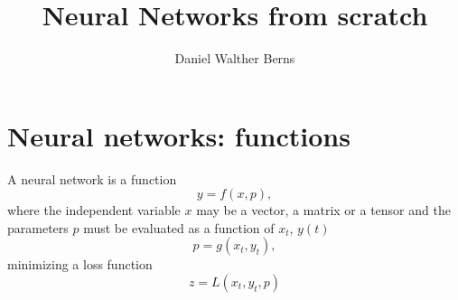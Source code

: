 \documentclass[10pt,a4paper]{article}
\author{Daniel Walther Berns}
\title{Neural Networks from scratch}
\begin{document}
	\section{Neural networks: functions}
	
	A neural network is a function
	\begin{equation}
		y = f(x, p),
	\end{equation}
    where the independent variable $x$ may be a vector, a matrix or a tensor and the parameters $p$ must be evaluated as a function of $x_{t}$, $y(t)$
    \begin{equation}
    	p = g(x_{t}, y_{t}),
    \end{equation}
    minimizing a loss function
    \begin{equation}
    	z = L(x_{t}, y_{t}, p)
    \end{equation}
\end{document}
